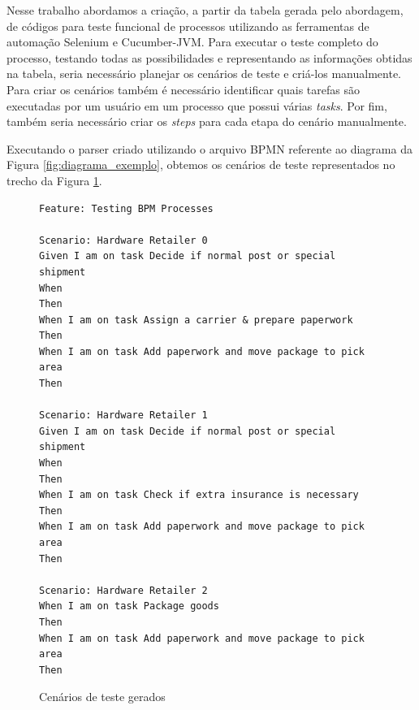 \documentclass[12pt]{article}
\begin{document}
\begin{table}[]
\centering
\caption{Tabela obtida através do arquivo BPMN}
\label{tab:resultado}
\end{table}

Nesse trabalho abordamos a criação, a partir da tabela gerada pelo abordagem, de códigos para teste funcional de processos utilizando as ferramentas de automação Selenium e Cucumber-JVM. Para executar o teste completo do processo, testando todas as possibilidades e representando as informações obtidas na tabela, seria necessário planejar os cenários de teste e criá-los manualmente. Para criar os cenários também é necessário identificar quais tarefas são executadas por um usuário em um processo que possui várias \emph{tasks}. Por fim, também seria necessário criar os \emph{steps} para cada etapa do cenário manualmente.

Executando o parser criado utilizando o arquivo BPMN referente ao diagrama da Figura \ref{fig:diagrama_exemplo}, obtemos os cenários de teste representados no trecho da Figura \ref{fig:cenarios}. 

\begin{figure}[ht]
\centering
\begin{lstlisting}[language=Gherkin,frame=single,basicstyle=\footnotesize\ttfamily]
Feature: Testing BPM Processes  
 
Scenario: Hardware Retailer 0 
Given I am on task Decide if normal post or special shipment 
When 
Then 
When I am on task Assign a carrier & prepare paperwork 
Then 
When I am on task Add paperwork and move package to pick area 
Then 
 
Scenario: Hardware Retailer 1 
Given I am on task Decide if normal post or special shipment 
When 
Then 
When I am on task Check if extra insurance is necessary 
Then 
When I am on task Add paperwork and move package to pick area 
Then 
 
Scenario: Hardware Retailer 2
When I am on task Package goods 
Then 
When I am on task Add paperwork and move package to pick area 
Then 
\end{lstlisting}
\caption{Cenários de teste gerados}
\label{fig:cenarios}
\end{figure}
\end{document}
